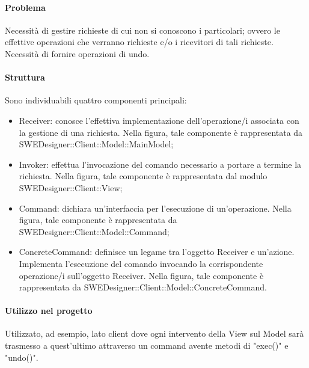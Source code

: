 \documentclass[../PianoDiQualifica.tex]{subfiles}
\begin{document}
				\paragraph{Problema\\}
					Necessità di gestire richieste di cui non si conoscono i particolari; ovvero le effettive operazioni che verranno richieste e/o i ricevitori di
					tali richieste. \\
					Necessità di fornire operazioni di undo.
				\paragraph{Struttura\\}
					Sono individuabili quattro componenti principali:
					\begin{itemize}
						\item Receiver: conosce l'effettiva implementazione dell'operazione/i associata con la gestione di una richiesta. Nella figura, tale componente è rappresentata da SWEDesigner::Client::Model::MainModel;
						\item Invoker: effettua l'invocazione del comando necessario a portare a termine la richiesta. Nella figura, tale componente è rappresentata dal modulo SWEDesigner::Client::View;
						\item Command: dichiara un'interfaccia per l'esecuzione di un'operazione. Nella figura, tale componente è rappresentata da  SWEDesigner::Client::Model::Command;
						\item ConcreteCommand: definisce un legame tra l'oggetto Receiver e un'azione. Implementa l'esecuzione del comando invocando la
								corrispondente operazione/i sull'oggetto Receiver. Nella figura, tale componente è rappresentata da  SWEDesigner::Client::Model::ConcreteCommand.
					\end{itemize}
				\paragraph{Utilizzo nel progetto\\}
					Utilizzato, ad esempio, lato client dove ogni intervento della View sul Model sarà
					trasmesso a quest'ultimo attraverso un command avente metodi di "exec()" e "undo()".	
\end{document}
